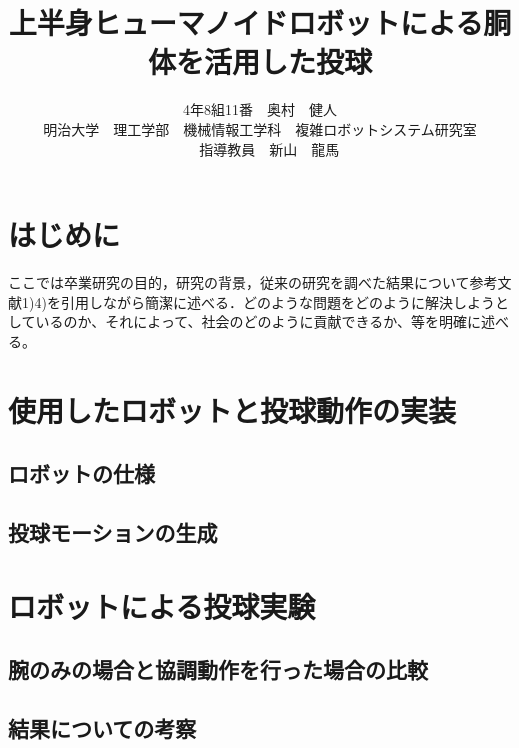 \documentclass[9pt, twocolumn, a4paper]{jsarticle_kijou}
\title{上半身ヒューマノイドロボットによる胴体を活用した投球}
\author{
4年8組11番　奥村　健人\\ %
明治大学　理工学部　機械情報工学科　複雑ロボットシステム研究室\\　%
指導教員　新山　龍馬　%
}
\date{}
\begin{document}
\maketitle


\section{はじめに}
ここでは卒業研究の目的，研究の背景，従来の研究を調べた結果について参考文献1)4)を引用しながら簡潔に述べる．どのような問題をどのように解決しようとしているのか、それによって、社会のどのように貢献できるか、等を明確に述べる。


\section{使用したロボットと投球動作の実装}
\subsection{ロボットの仕様}


\subsection{投球モーションの生成}


\section{ロボットによる投球実験}
\subsection{腕のみの場合と協調動作を行った場合の比較}


\subsection{結果についての考察}




\end{document}
